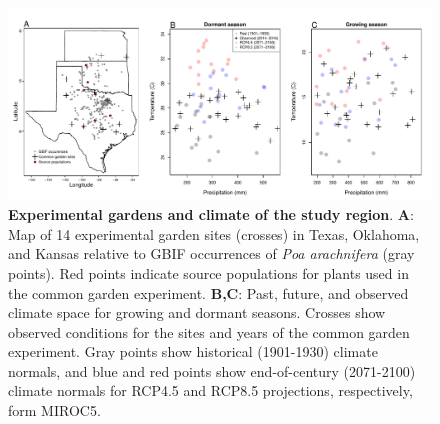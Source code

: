 \documentclass[12pt]{article}\usepackage[]{graphicx}\usepackage[dvipsnames]{xcolor}
\begin{document}
\begin{figure}[H]
  \begin{center}
    \includegraphics[width=1\linewidth]{Figures/tom_map_v2.pdf}
  \caption{\textbf{Experimental gardens and climate of the study region}. 
  	\textbf{A}: Map of 14 experimental garden sites (crosses) in Texas, Oklahoma, and Kansas relative to GBIF occurrences of \textit{Poa arachnifera} (gray points). Red points indicate source populations for plants used in the common garden experiment. 
  	\textbf{B,C}: Past, future, and observed climate space for growing and dormant seasons. Crosses show observed conditions for the sites and years of the common garden experiment. Gray points show historical (1901-1930) climate normals, and blue and red points show end-of-century (2071-2100) climate normals for RCP4.5 and RCP8.5 projections, respectively, form MIROC5. 
  }
  \label{fig:study_design}
  \end{center}
\end{figure}
\end{document}
